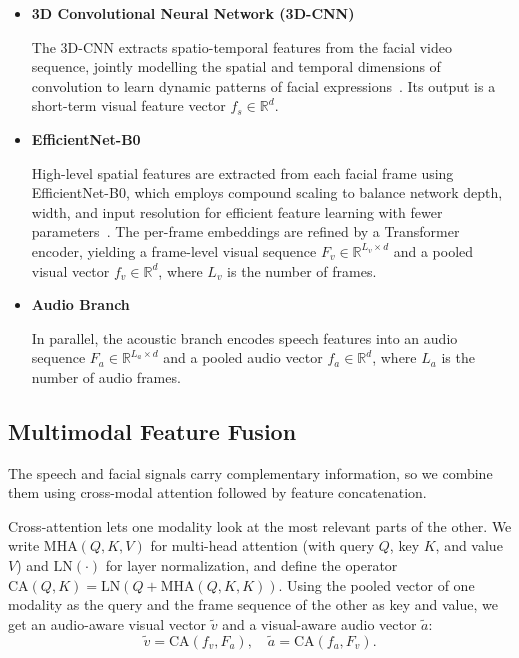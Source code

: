 \documentclass[conference]{IEEEtran}
\begin{document}
\begin{itemize}

\item \textbf{3D Convolutional Neural Network (3D-CNN)}

The 3D-CNN extracts spatio-temporal features from the facial video sequence, jointly modelling the spatial and temporal dimensions of convolution to learn dynamic patterns of facial expressions~\cite{ref7}. Its output is a short-term visual feature vector $f_s \in \mathbb{R}^{d}$.

\item \textbf{EfficientNet-B0}

High-level spatial features are extracted from each facial frame using EfficientNet-B0, which employs compound scaling to balance network depth, width, and input resolution for efficient feature learning with fewer parameters~\cite{ref6}. The per-frame embeddings are refined by a Transformer encoder, yielding a frame-level visual sequence $F_v \in \mathbb{R}^{L_v \times d}$ and a pooled visual vector $f_v \in \mathbb{R}^{d}$, where $L_v$ is the number of frames.

\item \textbf{Audio Branch}

In parallel, the acoustic branch encodes speech features into an audio sequence $F_a \in \mathbb{R}^{L_a \times d}$ and a pooled audio vector $f_a \in \mathbb{R}^{d}$, where $L_a$ is the number of audio frames.

\end{itemize}

\subsection{Multimodal Feature Fusion}

The speech and facial signals carry complementary information, so we combine them using cross-modal attention followed by feature concatenation.

Cross-attention lets one modality look at the most relevant parts of the other. We write $\mathrm{MHA}(Q,K,V)$ for multi-head attention (with query $Q$, key $K$, and value $V$) and $\mathrm{LN}(\cdot)$ for layer normalization, and define the operator $\mathrm{CA}(Q,K)=\mathrm{LN}(Q+\mathrm{MHA}(Q,K,K))$. Using the pooled vector of one modality as the query and the frame sequence of the other as key and value, we get an audio-aware visual vector $\tilde{v}$ and a visual-aware audio vector $\tilde{a}$:
\begin{equation}
\tilde{v} = \mathrm{CA}(f_v, F_a), \quad \tilde{a} = \mathrm{CA}(f_a, F_v).
\end{equation}
\end{document}
